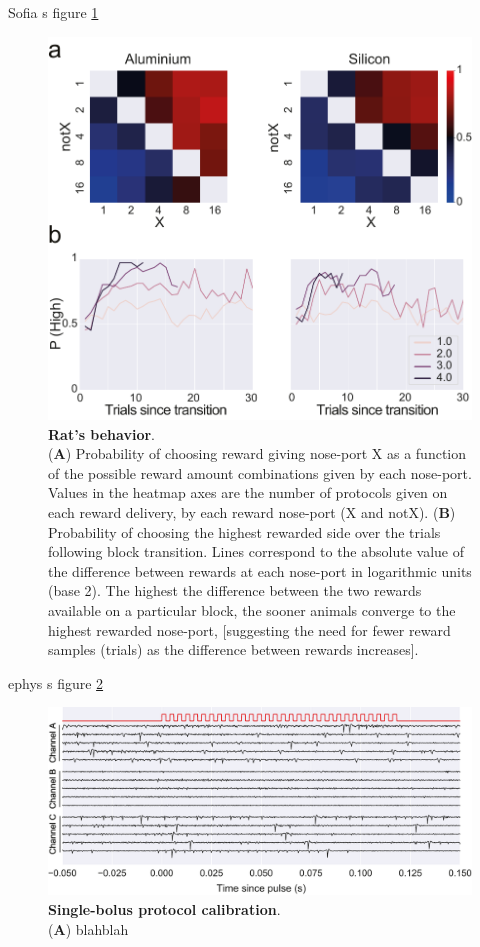 Sofia s figure \ref{fig:Behavior}
\begin{figure}[ht] 
	\centering
	\includegraphics[width=1.0\linewidth]{Figures/Artboard 9.pdf}
	\caption{\textbf{Rat's behavior}.\\
		(\textbf{A}) Probability of choosing reward giving nose-port X as a function of the possible reward amount combinations given by each nose-port. Values in the heatmap axes are the number of protocols given on each reward delivery, by each reward nose-port (X and notX). (\textbf{B}) Probability of choosing the highest rewarded side over the trials following block transition. Lines correspond to the absolute value of the difference between rewards at each nose-port in logarithmic units (base 2). The highest the difference between the two rewards available on a particular block, the sooner animals converge to the highest rewarded nose-port, [suggesting the need for fewer reward samples (trials) as the difference between rewards increases]. }
	
	\label{fig:Behavior} 
\end{figure}

ephys s figure \ref{fig:Ephys}
\begin{figure}[ht] 
	\centering
	\includegraphics[width=1.0\linewidth]{Figures/Artboard 7.pdf}
	\caption{\textbf{Single-bolus protocol calibration}.\\
	(\textbf{A}) blahblah }	
	\label{fig:Ephys}
\end{figure}



